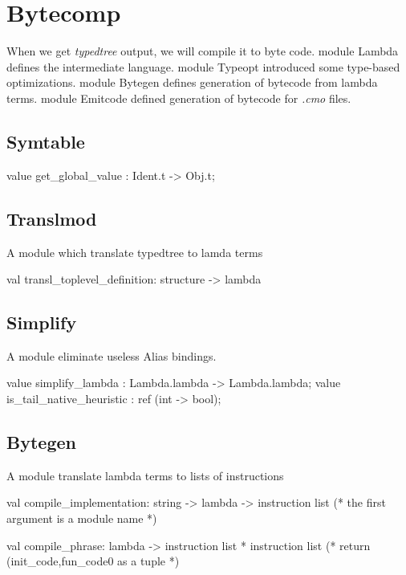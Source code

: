 
\section{Bytecomp}

When we get \textit{typedtree} output, we will compile it to byte
code.  module Lambda defines the intermediate language. module Typeopt
introduced some type-based optimizations.  module Bytegen defines
generation of bytecode from lambda terms. module Emitcode defined
generation of bytecode for \textit{.cmo} files.


\subsection{Symtable}

\begin{ocamlcode}
value get_global_value : Ident.t -> Obj.t;
\end{ocamlcode}

\subsection{Translmod}

A module which translate typedtree to lamda terms

\begin{ocamlcode}
val transl_toplevel_definition: structure -> lambda
\end{ocamlcode}

\subsection{Simplify}
A module eliminate useless Alias bindings.

\begin{ocamlcode}
  value simplify_lambda : Lambda.lambda -> Lambda.lambda;
  value is_tail_native_heuristic : ref (int -> bool);
\end{ocamlcode}

\subsection{Bytegen}
A module translate lambda terms to lists of instructions
\begin{ocamlcode}
val compile_implementation: string -> lambda -> instruction list
(* the first argument is a module name *)

val compile_phrase: lambda -> instruction list * instruction list
(* return (init_code,fun_code0 as a tuple *)
\end{ocamlcode}

